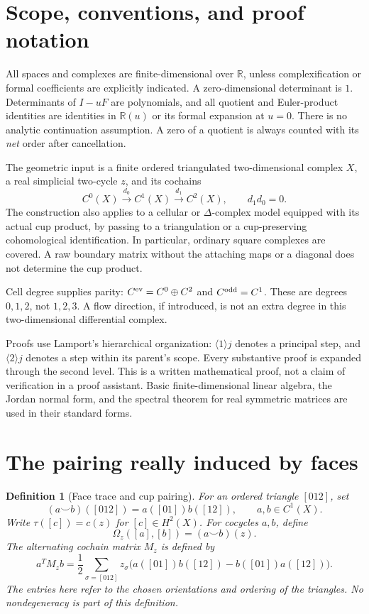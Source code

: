 \documentclass[11pt,a4paper]{article}
\newtheorem{definition}{Definition}[section]
\theoremstyle{remark}\newtheorem{remark}[definition]{Remark}
\newcommand{\R}{\mathbb R}\newcommand{\C}{\mathbb C}\newcommand{\Z}{\mathbb Z}
\begin{document}
\section{Scope, conventions, and proof notation}

All spaces and complexes are finite-dimensional over $\R$, unless complexification or formal coefficients are explicitly indicated. A zero-dimensional determinant is $1$. Determinants of $I-uF$ are polynomials, and all quotient and Euler-product identities are identities in $\R(u)$ or its formal expansion at $u=0$. There is no analytic continuation assumption. A zero of a quotient is always counted with its \emph{net} order after cancellation.

The geometric input is a finite ordered triangulated two-dimensional complex $X$, a real simplicial two-cycle $z$, and its cochains
\[
C^0(X)\xrightarrow{d_0}C^1(X)\xrightarrow{d_1}C^2(X),\qquad d_1d_0=0.
\]
The construction also applies to a cellular or $\Delta$-complex model equipped with its actual cup product, by passing to a triangulation or a cup-preserving cohomological identification. In particular, ordinary square complexes are covered. A raw boundary matrix without the attaching maps or a diagonal does not determine the cup product.

Cell degree supplies parity: $C^{\rm ev}=C^0\oplus C^2$ and $C^{\rm odd}=C^1$. These are degrees $0,1,2$, not $1,2,3$. A flow direction, if introduced, is not an extra degree in this two-dimensional differential complex.

Proofs use Lamport's hierarchical organization: $\langle1\rangle j$ denotes a principal step, and $\langle2\rangle j$ denotes a step within its parent's scope. Every substantive proof is expanded through the second level. This is a written mathematical proof, not a claim of verification in a proof assistant. Basic finite-dimensional linear algebra, the Jordan normal form, and the spectral theorem for real symmetric matrices are used in their standard forms.

\section{The pairing really induced by faces}

\begin{definition}[Face trace and cup pairing]\label{def:face}
For an ordered triangle $[012]$, set
\[
(a\smile b)([012])=a([01])b([12]),\qquad a,b\in C^1(X).
\]
Write $\tau([c])=c(z)$ for $[c]\in H^2(X)$. For cocycles $a,b$, define
\[
\Omega_z([a],[b])=(a\smile b)(z).
\]
The alternating cochain matrix $M_z$ is defined by
\[
a^TM_zb=\frac12\sum_{\sigma=[012]}z_\sigma
\bigl(a([01])b([12])-b([01])a([12])\bigr).
\tag{2.1}\label{eq:face-matrix}
\]
The entries here refer to the chosen orientations and ordering of the triangles. No nondegeneracy is part of this definition.
\end{definition}
\end{document}
